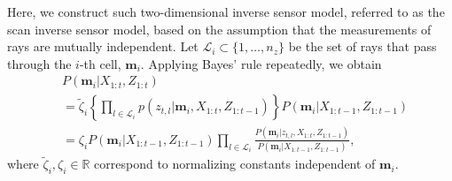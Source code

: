 \documentclass[letterpaper, 10pt, conference]{ieeeconf}
\newcommand{\braces}[1]{\ensuremath{\left\{ #1 \right\}}}
\newcommand{\refeqn}[1]{(\ref{eqn:#1})}
\renewcommand{\Re}{\ensuremath{\mathbb{R}}}
\begin{document}
Here, we construct such two-dimensional inverse sensor model, referred to as the scan inverse sensor model, based on the assumption that the measurements of rays are mutually independent.
Let $\mathcal L_i\subset\{1,\ldots, n_z\}$ be the set of rays that pass through the $i$-th cell, $\mathbf{m}_i$. Applying Bayes' rule repeatedly, we obtain
\begin{align}
&P(\mathbf{m}_i|X_{1:t},Z_{1:t})\nonumber\\
&=\tilde\zeta_i\braces{\prod_{l\in\mathcal{L}_i}p(z_{t,l}|\mathbf{m}_i,X_{1:t},Z_{1:t-1})}P(\mathbf{m}_i|X_{1:t-1},Z_{1:t-1})\nonumber\\
%
&=
\zeta_i P(\mathbf{m}_i|X_{1:t-1},Z_{1:t-1})%
\prod_{l\in\mathcal{L}_i}\frac{P(\mathbf{m}_i|z_{t,l},X_{1:t},Z_{1:t-1})}{P(\mathbf{m}_i|X_{1:t-1},Z_{1:t-1})},
\label{eqn:ThirdBayesRule}
\end{align}
where $\tilde\zeta_i,\zeta_i\in\Re$ correspond to normalizing constants independent of $\mathbf{m}_i$. 

\end{document}
